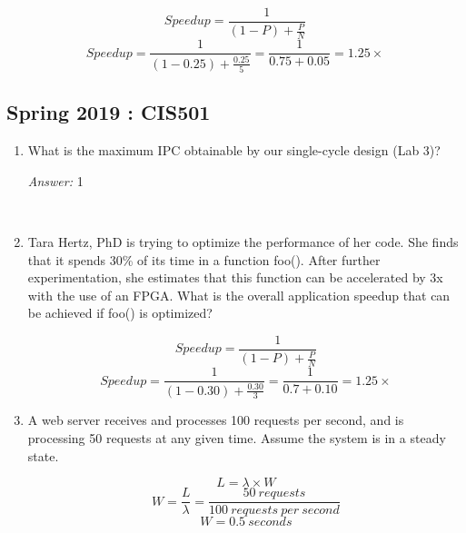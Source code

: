 \documentclass[12pt]{article}
\newenvironment{QandA}{\begin{enumerate}[label=\bfseries\arabic*.]\bfseries}
                      {\end{enumerate}}
\newenvironment{answered}{\par\quad\normalfont}{}
\begin{document}
\begin{QandA}
    \begin{answered}
    \begin{equation*}
    Speedup = \frac{1}{(1-P)+\frac{P}{N}}    
    \end{equation*}
    \begin{equation*}
    Speedup = \frac{1}{(1-0.25)+\frac{0.25}{5}} = \frac{1}{0.75+0.05} = 1.25\times
    \end{equation*}
    \end{answered}

\end{QandA}

\subsection{Spring 2019 : CIS501}

\begin{QandA}
   \item What is the maximum IPC obtainable by our single-cycle design (Lab 3)?
        \begin{answered}
        \textit{Answer:} 1
        \end{answered}
        
    \
        
    \item Tara Hertz, PhD is trying to optimize the performance of her code. She finds that it spends 30\% of its time in a function foo(). After further experimentation, she estimates that this function can be accelerated by 3x with the use of an FPGA. What is the overall application speedup that can be achieved if foo() is optimized?
        \begin{answered}
        \begin{equation*}
        Speedup = \frac{1}{(1-P)+\frac{P}{N}}    
        \end{equation*}
        \begin{equation*}
        Speedup = \frac{1}{(1-0.30)+\frac{0.30}{3}} = \frac{1}{0.7+0.10} = 1.25\times
        \end{equation*}
        \end{answered}
        
    \item A web server receives and processes 100 requests per second, and is processing 50 requests at any given time. Assume the system is in a steady state.
    
    \begin{answered}
    \begin{equation*}
        L = \lambda \times W
    \end{equation*}
    \begin{equation*}
        W = \frac{L}{\lambda} = \frac{50\ requests}{100\ requests\ per\ second}
    \end{equation*}
    \begin{equation*}
        W = 0.5\ seconds
    \end{equation*}
    

\end{answered}
\end{QandA}
\end{document}
